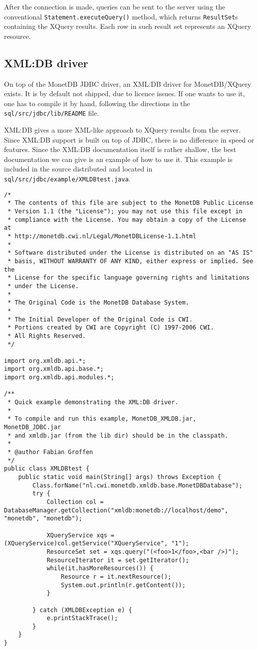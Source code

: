 \documentclass{article}
\begin{document}
After the connection is made, queries can be sent to the server using
the conventional \texttt{Statement.executeQuery()} method, which returns
\texttt{ResultSet}s containing the XQuery results.  Each row in such
result set represents an XQuery resource.

\subsection{XML:DB driver}
On top of the MonetDB JDBC driver, an XML:DB driver for MonetDB/XQuery
exists.  It is by default not shipped, due to licence issues.  If one
wants to use it, one has to compile it by hand, following the directions
in the \texttt{sql/src/jdbc/lib/README} file.

XML:DB gives a more XML-like approach to XQuery results from the server.
Since XML:DB support is built on top of JDBC, there is no difference in
speed or features.  Since the XML:DB documentation itself is rather
shallow, the best documentation we can give is an example of how to use
it.  This example is included in the source distributed and located in
\texttt{sql/src/jdbc/example/XMLDBtest.java}.

\begin{verbatim}
/*
 * The contents of this file are subject to the MonetDB Public License
 * Version 1.1 (the "License"); you may not use this file except in
 * compliance with the License. You may obtain a copy of the License at
 * http://monetdb.cwi.nl/Legal/MonetDBLicense-1.1.html
 *
 * Software distributed under the License is distributed on an "AS IS"
 * basis, WITHOUT WARRANTY OF ANY KIND, either express or implied. See the
 * License for the specific language governing rights and limitations
 * under the License.
 *
 * The Original Code is the MonetDB Database System.
 *
 * The Initial Developer of the Original Code is CWI.
 * Portions created by CWI are Copyright (C) 1997-2006 CWI.
 * All Rights Reserved.
 */

import org.xmldb.api.*;
import org.xmldb.api.base.*;
import org.xmldb.api.modules.*;

/**
 * Quick example demonstrating the XML:DB driver.
 *
 * To compile and run this example, MonetDB_XMLDB.jar, MonetDB_JDBC.jar
 * and xmldb.jar (from the lib dir) should be in the classpath.
 *
 * @author Fabian Groffen
 */
public class XMLDBtest {
	public static void main(String[] args) throws Exception {
		Class.forName("nl.cwi.monetdb.xmldb.base.MonetDBDatabase");
		try {
			Collection col = DatabaseManager.getCollection("xmldb:monetdb://localhost/demo", "monetdb", "monetdb"); 

			XQueryService xqs = (XQueryService)col.getService("XQueryService", "1");
			ResourceSet set = xqs.query("(<foo>1</foo>,<bar />)");
			ResourceIterator it = set.getIterator();
			while(it.hasMoreResources()) {
				Resource r = it.nextResource();
				System.out.println(r.getContent());
			}
			
		} catch (XMLDBException e) {
			e.printStackTrace();
		}
	}
}
\end{verbatim}
\end{document}

